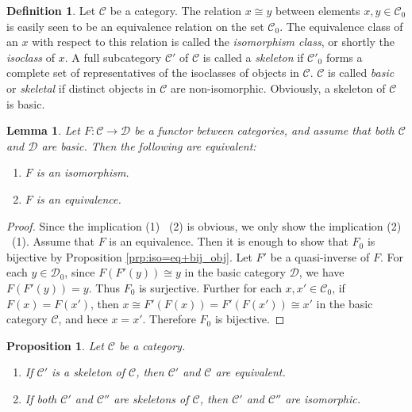 \documentclass{surv-l}
\numberwithin{equation}{chapter}
\numberwithin{figure}{chapter}
\theoremstyle{plain}
\newtheorem{lem}[thm]{Lemma}
\newtheorem{prp}[thm]{Proposition}
\theoremstyle{definition}
\newtheorem{dfn}[thm]{Definition}
\theoremstyle{remark}
\begin{document}
\begin{dfn}\label{dfn:skeleton}
Let ${\mathcal{C}}$ be a category.
The relation $x \cong y$ between elements $x, y \in {\mathcal{C}}_0$
is easily seen to be an equivalence relation on the set ${\mathcal{C}}_0$.
The equivalence class of an $x$ with respect to this relation is called
the \emph{isomorphism class}, or shortly the \emph{isoclass} of $x$.
A full subcategory ${\mathcal{C}}'$ of ${\mathcal{C}}$ is called a \emph{skeleton}
if ${\mathcal{C}}'_0$ forms a complete set of representatives of the isoclasses of
objects in ${\mathcal{C}}$.
${\mathcal{C}}$ is called \emph{basic} or \emph{skeletal} if distinct objects in ${\mathcal{C}}$
are non-isomorphic.
Obviously, a skeleton of ${\mathcal{C}}$ is basic.
\end{dfn}

\begin{lem}\label{lem:basic-eq=iso}
Let $F\colon {\mathcal{C}} \to {\mathcal{D}}$ be a functor between categories, and
assume that both ${\mathcal{C}}$ and ${\mathcal{D}}$ are basic.
Then the following are equivalent:
\begin{enumerate}
\item
$F$ is an isomorphism.
\item
$F$ is an equivalence.
\end{enumerate}
\end{lem}

\begin{proof}
Since the implication (1) \text{$\Rightarrow$}\  (2) is obvious,
we only show the implication (2) \text{$\Rightarrow$}\  (1).
Assume that $F$ is an equivalence.
Then it is enough to show that $F_0$ is bijective
by Proposition \ref{prp:iso=eq+bij_obj}.
Let $F'$ be a quasi-inverse of $F$.
For each $y \in {\mathcal{D}}_0$, since $F(F'(y)) \cong y$ in the basic category ${\mathcal{D}}$,
we have $F(F'(y)) = y$.
Thus $F_0$ is surjective.
Further for each $x, x' \in {\mathcal{C}}_0$, if $F(x) = F(x')$,
then $x \cong F'(F(x)) = F'(F(x')) \cong x'$ in the basic category ${\mathcal{C}}$,
and hece $x = x'$.
Therefore $F_0$ is bijective.
\end{proof}

\begin{prp}\label{prp:skeleton}
Let ${\mathcal{C}}$ be a category.
\begin{enumerate}
\item
If ${\mathcal{C}}'$ is a skeleton of ${\mathcal{C}}$, then
${\mathcal{C}}'$ and ${\mathcal{C}}$ are equivalent.
\item
If both ${\mathcal{C}}'$ and ${\mathcal{C}}''$ are skeletons of ${\mathcal{C}}$, then
${\mathcal{C}}'$ and ${\mathcal{C}}''$ are isomorphic.
\end{enumerate}
\end{prp}
\end{document}
